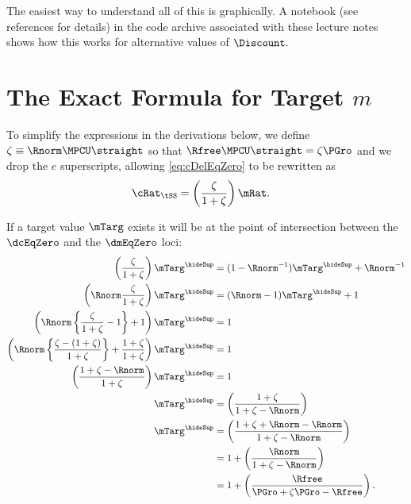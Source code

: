 \documentclass{\handout}
\begin{document}
The easiest way to understand all of this is graphically.  A notebook \cite{When-FHWC-Holds} (see references for details) in the code archive associated with these lecture notes shows how this works for alternative values of $\Discount.$


\section{The Exact Formula for Target $m$}\label{sec:mTargExact}

To simplify the expressions in the derivations below, we define $\zeta \equiv \Rnorm \MPCU \straight$ so that $\Rfree \MPCU \straight = \zeta \PGro$ and we drop the $e$ superscripts, allowing \eqref{eq:cDelEqZero} to be rewritten as 
\begin{equation}\begin{gathered}\begin{aligned}
  \cRat_{\tSS} & =  \left(\frac{\zeta }{1+\zeta}\right)\mRat .
\end{aligned}\end{gathered}\end{equation}

If a target value $\mTarg$ exists it will be at the point of intersection between the $\dcEqZero$ and the $\dmEqZero$ loci:
\begin{equation}\begin{gathered}\begin{aligned}
  \left(\frac{\zeta}{1+\zeta}\right)\mTarg^{\hideSup} & =  (1-\Rnorm^{-1})\mTarg^{\hideSup}+\Rnorm^{-1}
\\  \left(\Rnorm\frac{\zeta}{1+\zeta}\right)\mTarg^{\hideSup} & =  (\Rnorm-1)\mTarg^{\hideSup}+1
\\  \left(\Rnorm\left\{\frac{\zeta}{1+\zeta}-1\right\}+1\right)\mTarg^{\hideSup} & =  1
\\  \left(\Rnorm\left\{\frac{\zeta-(1+\zeta)}{1+\zeta}\right\}+\frac{1+\zeta}{1+\zeta}\right)\mTarg^{\hideSup} & =  1
\\  \left(\frac{1+\zeta-\Rnorm}{1+\zeta}\right)\mTarg^{\hideSup} & =  1
\\  \mTarg^{\hideSup} & =  \left(\frac{1+\zeta}{1+\zeta-\Rnorm}\right)
\\  \mTarg^{\hideSup} & =  \left(\frac{1+\zeta+\Rnorm-\Rnorm}{1+\zeta-\Rnorm}\right)
\\ & =  1 + \left(\frac{\Rnorm}{1+\zeta-\Rnorm}\right)
\\ & =  1 + \left(\frac{\Rfree}{\PGro+\zeta\PGro-\Rfree}\right)  \label{eq:mTarget}
.
\end{aligned}\end{gathered}\end{equation}
\end{document}
